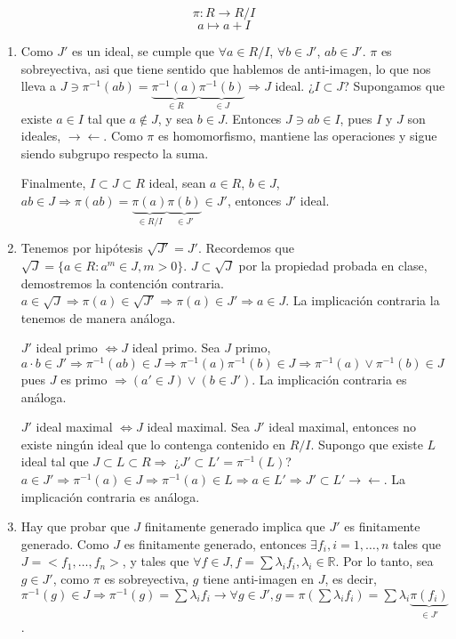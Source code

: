 $$\pi: R \rightarrow R/I $$
$$ a \mapsto a+I$$
\begin{enumerate}
\item Como $J'$ es un ideal, se cumple que $\forall a \in R/I$, $\forall b\in J'$, $ab\in J'$. $\pi$ es sobreyectiva, asi que tiene sentido que hablemos de anti-imagen, lo que nos lleva a $J\ni \pi^{-1}(ab)=\underbrace{\pi^{-1}(a)}_{\in R}\underbrace{\pi^{-1}(b)}_{\in J} \Rightarrow J$ ideal. ¿$I\subset J$? Supongamos que existe $a\in I$ tal que $a\notin J$, y sea $b\in J$. Entonces $J \ni ab \in I$, pues $I$ y $J$ son ideales, $\rightarrow \leftarrow $. Como $\pi$ es homomorfismo, mantiene las operaciones y sigue siendo subgrupo respecto la suma.

  Finalmente, $I\subset J\subset R$ ideal, sean $a\in R$, $b\in J$, $ab\in J \Rightarrow \pi(ab)=\underbrace{\pi(a)}_{\in R/I}\underbrace{\pi(b)}_{\in J'} \in J'$, entonces $J'$ ideal.

\item Tenemos por hipótesis $\sqrt{J'}=J'$. Recordemos que $\sqrt{J}=\{ a\in R : a^m\in J, m>0 \}$. $J\subset \sqrt{J}$ por la propiedad probada en clase, demostremos la contención contraria.
  $a\in \sqrt{J}\Rightarrow \pi(a)\in \sqrt{J'} \Rightarrow \pi(a)\in J' \Rightarrow a \in J$. La implicación contraria la tenemos de manera análoga.

  $J'$ ideal primo $\Leftrightarrow J$ ideal primo. Sea $J$ primo, $a\cdot b \in J' \Rightarrow \pi^{-1}(ab) \in J \Rightarrow \pi^{-1}(a)\pi^{-1}(b) \in J \Rightarrow \pi^{-1}(a) \vee \pi^{-1}(b) \in J$ pues $J$ es primo $\Rightarrow (a' \in J) \vee (b \in J')$. La implicación contraria es análoga.

  $J'$ ideal maximal $\Leftrightarrow J$ ideal maximal. Sea $J'$ ideal maximal, entonces no existe ningún ideal que lo contenga contenido en $R/I$. Supongo que existe $L$ ideal tal que $J\subset L \subset R \Rightarrow $ ¿$J'\subset L'=\pi^{-1}(L)$? $a\in J' \Rightarrow \pi^{-1}(a)\in J \Rightarrow \pi^{-1}(a)\in L \Rightarrow a \in L' \Rightarrow J'\subset L' \rightarrow \leftarrow$. La implicación contraria es análoga.

\item Hay que probar que $J$ finitamente generado implica que $J'$ es finitamente generado. Como $J$ es finitamente generado, entonces $\exists f_i, i=1,\dots,n$ tales que $J=<f_1,\dots,f_n>$, y tales que $\forall f \in J, f=\sum \lambda_if_i, \lambda_i\in \mathbb{R}$. Por lo tanto, sea $g\in J'$, como $\pi$ es sobreyectiva, $g$ tiene anti-imagen en $J$, es decir, $\pi^{-1}(g)\in J \Rightarrow \pi^{-1}(g)=\sum \lambda_if_i \rightarrow \forall g \in J', g =\pi(\sum \lambda_i f_i)=\sum \lambda_i\underbrace{\pi(f_i)}_{\in J'}$.
\end{enumerate}

